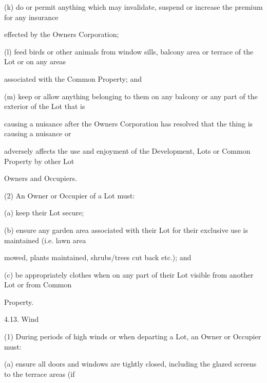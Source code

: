 \documentclass{article}
\begin{document}
{\fontsize{9.962}{1}(k) do or permit anything which may invalidate, suspend or increase the premium for any insurance }

{\fontsize{10.02}{1}effected by the Owners Corporation; }

\newpage


















{\fontsize{9.962}{1}(l) feed birds or other animals from window sills, balcony area or terrace of the Lot or on any areas }

{\fontsize{10.02}{1}associated with the Common Property; and }

{\fontsize{9.962}{1}(m) keep or allow anything belonging to them on any balcony or any part of the exterior of the Lot that is }

{\fontsize{10.02}{1}causing a nuisance after the Owners Corporation has resolved that the thing is causing a nuisance or }

{\fontsize{10.02}{1}adversely affects the use and enjoyment of the Development, Lots or Common Property by other Lot }

{\fontsize{10.02}{1}Owners and Occupiers. }

{\fontsize{9.962}{1}(2) An Owner or Occupier of a Lot must: }

{\fontsize{9.962}{1}(a) keep their Lot secure; }

{\fontsize{9.962}{1}(b) ensure any garden area associated with their Lot for their exclusive use is maintained (i.e. lawn area }

{\fontsize{10.02}{1}mowed, plants maintained, shrubs/trees cut back etc.); and }

{\fontsize{9.962}{1}(c) be appropriately clothes when on any part of their Lot visible from another Lot or from Common }

{\fontsize{10.02}{1}Property. }

{\fontsize{9.99}{1}4.13. Wind }

{\fontsize{9.962}{1}(1) During periods of high winds or when departing a Lot, an Owner or Occupier must: }

{\fontsize{9.962}{1}(a) ensure all doors and windows are tightly closed, including the glazed screens to the terrace areas (if }
\end{document}
